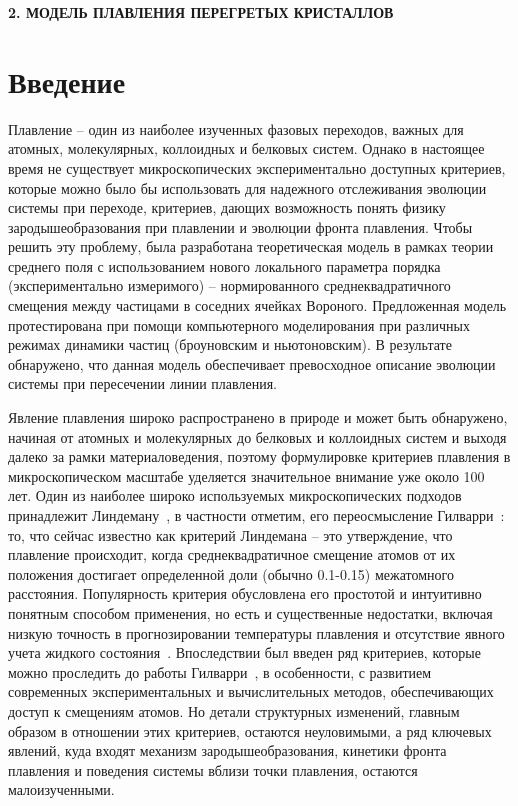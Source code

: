 \newpage
\begin{center}
  \textbf{\large 2. МОДЕЛЬ ПЛАВЛЕНИЯ ПЕРЕГРЕТЫХ КРИСТАЛЛОВ}
\end{center}


\section{Введение}

Плавление -- один из наиболее изученных фазовых переходов, важных для атомных, молекулярных, коллоидных и белковых систем.
Однако в настоящее время не существует микроскопических экспериментально доступных критериев, которые можно было бы использовать для надежного отслеживания эволюции системы при переходе, критериев, дающих возможность понять физику зародышеобразования при плавлении и эволюции фронта плавления.
Чтобы решить эту проблему, была разработана теоретическая модель в рамках теории среднего поля с использованием нового локального параметра порядка (экспериментально измеримого) -- нормированного среднеквадратичного смещения между частицами в соседних ячейках Вороного.
Предложенная модель протестирована при помощи компьютерного моделирования при различных режимах динамики частиц (броуновским и ньютоновским).
В результате обнаружено, что данная модель обеспечивает превосходное описание эволюции системы при пересечении линии плавления.

Явление плавления широко распространено в природе и может быть обнаружено, начиная от атомных и молекулярных до белковых и коллоидных систем и выходя далеко за рамки материаловедения, поэтому формулировке критериев плавления в микроскопическом масштабе уделяется значительное внимание уже около 100 лет.
Один из наиболее широко используемых микроскопических подходов принадлежит Линдеману~\cite{lindemann1910}, в частности отметим, его переосмысление Гилварри~\cite{10.1103/physrev.102.308}: то, что сейчас известно как критерий Линдемана -- это утверждение, что плавление происходит, когда среднеквадратичное смещение атомов от их положения достигает определенной доли (обычно 0.1-0.15) межатомного расстояния.
Популярность критерия обусловлена его простотой и интуитивно понятным способом применения, но есть и существенные недостатки, включая низкую точность в прогнозировании температуры плавления и отсутствие явного учета жидкого состояния~\cite{10.1098/rspa.1991.0068}.
Впоследствии был введен ряд критериев, которые можно проследить до работы Гилварри~\cite{10.1063/1.1426419}, в особенности, с развитием современных экспериментальных и вычислительных методов, обеспечивающих доступ к смещениям атомов.
Но детали структурных изменений, главным образом в отношении этих критериев, остаются неуловимыми, а ряд ключевых явлений, куда входят механизм зародышеобразования, кинетики фронта плавления и поведения системы вблизи точки плавления, остаются малоизученными.


